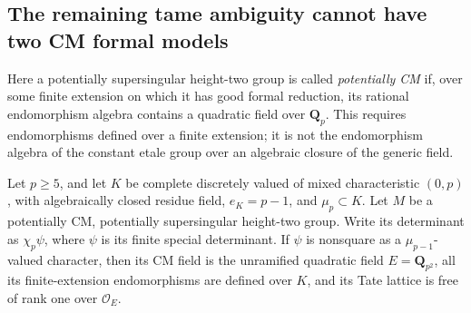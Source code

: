 \subsection{The remaining tame ambiguity cannot have two CM formal models}

Here a potentially supersingular height-two group is called
\emph{potentially CM} if, over some finite extension on which it
has good formal reduction, its rational endomorphism algebra
contains a quadratic field over $\mathbf Q_p$. This requires
endomorphisms defined over a finite extension; it is not the
endomorphism algebra of the constant etale group over an
algebraic closure of the generic field.

\begin{lemma}
\label{lem:B-RD52-CM}
Let $p\geq5$, and let $K$ be complete discretely valued of mixed
characteristic $(0,p)$, with algebraically closed residue field,
$e_K=p-1$, and $\mu_p\subset K$. Let $M$ be a potentially CM,
potentially supersingular height-two group. Write its determinant
as $\chi_p\psi$, where $\psi$ is its finite special determinant.
If $\psi$ is nonsquare as a $\mu_{p-1}$-valued character, then
its CM field is the unramified quadratic field $E=\mathbf Q_{p^2}$,
all its finite-extension endomorphisms are defined over $K$, and its Tate lattice
is free of rank one over $\mathcal O_E$.
\end{lemma}
